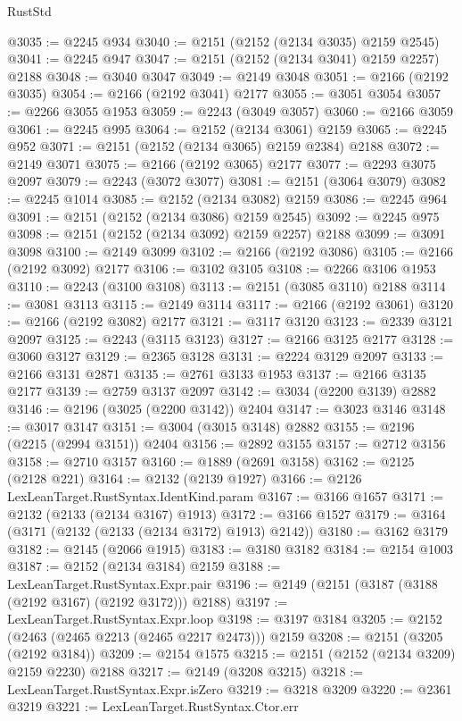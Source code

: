 \begin{lexlean}{RustStd}
\begin{coremodule}
@3035 := @2245 @934
@3040 := @2151 (@2152 (@2134 @3035) @2159 @2545)
@3041 := @2245 @947
@3047 := @2151 (@2152 (@2134 @3041) @2159 @2257) @2188
@3048 := @3040 @3047
@3049 := @2149 @3048
@3051 := @2166 (@2192 @3035)
@3054 := @2166 (@2192 @3041) @2177
@3055 := @3051 @3054
@3057 := @2266 @3055 @1953
@3059 := @2243 (@3049 @3057)
@3060 := @2166 @3059
@3061 := @2245 @995
@3064 := @2152 (@2134 @3061) @2159
@3065 := @2245 @952
@3071 := @2151 (@2152 (@2134 @3065) @2159 @2384) @2188
@3072 := @2149 @3071
@3075 := @2166 (@2192 @3065) @2177
@3077 := @2293 @3075 @2097
@3079 := @2243 (@3072 @3077)
@3081 := @2151 (@3064 @3079)
@3082 := @2245 @1014
@3085 := @2152 (@2134 @3082) @2159
@3086 := @2245 @964
@3091 := @2151 (@2152 (@2134 @3086) @2159 @2545)
@3092 := @2245 @975
@3098 := @2151 (@2152 (@2134 @3092) @2159 @2257) @2188
@3099 := @3091 @3098
@3100 := @2149 @3099
@3102 := @2166 (@2192 @3086)
@3105 := @2166 (@2192 @3092) @2177
@3106 := @3102 @3105
@3108 := @2266 @3106 @1953
@3110 := @2243 (@3100 @3108)
@3113 := @2151 (@3085 @3110) @2188
@3114 := @3081 @3113
@3115 := @2149 @3114
@3117 := @2166 (@2192 @3061)
@3120 := @2166 (@2192 @3082) @2177
@3121 := @3117 @3120
@3123 := @2339 @3121 @2097
@3125 := @2243 (@3115 @3123)
@3127 := @2166 @3125 @2177
@3128 := @3060 @3127
@3129 := @2365 @3128
@3131 := @2224 @3129 @2097
@3133 := @2166 @3131 @2871
@3135 := @2761 @3133 @1953
@3137 := @2166 @3135 @2177
@3139 := @2759 @3137 @2097
@3142 := @3034 (@2200 @3139) @2882
@3146 := @2196 (@3025 (@2200 @3142)) @2404
@3147 := @3023 @3146
@3148 := @3017 @3147
@3151 := @3004 (@3015 @3148) @2882
@3155 := @2196 (@2215 (@2994 @3151)) @2404
@3156 := @2892 @3155
@3157 := @2712 @3156
@3158 := @2710 @3157
@3160 := @1889 (@2691 @3158)
@3162 := @2125 (@2128 @221)
@3164 := @2132 (@2139 @1927)
@3166 := @2126 LexLeanTarget.RustSyntax.IdentKind.param
@3167 := @3166 @1657
@3171 := @2132 (@2133 (@2134 @3167) @1913)
@3172 := @3166 @1527
@3179 := @3164 (@3171 (@2132 (@2133 (@2134 @3172) @1913) @2142))
@3180 := @3162 @3179
@3182 := @2145 (@2066 @1915)
@3183 := @3180 @3182
@3184 := @2154 @1003
@3187 := @2152 (@2134 @3184) @2159
@3188 := LexLeanTarget.RustSyntax.Expr.pair
@3196 := @2149 (@2151 (@3187 (@3188 (@2192 @3167) (@2192 @3172))) @2188)
@3197 := LexLeanTarget.RustSyntax.Expr.loop
@3198 := @3197 @3184
@3205 := @2152 (@2463 (@2465 @2213 (@2465 @2217 @2473))) @2159
@3208 := @2151 (@3205 (@2192 @3184))
@3209 := @2154 @1575
@3215 := @2151 (@2152 (@2134 @3209) @2159 @2230) @2188
@3217 := @2149 (@3208 @3215)
@3218 := LexLeanTarget.RustSyntax.Expr.isZero
@3219 := @3218 @3209
@3220 := @2361 @3219
@3221 := LexLeanTarget.RustSyntax.Ctor.err

\end{coremodule}
\end{lexlean}
